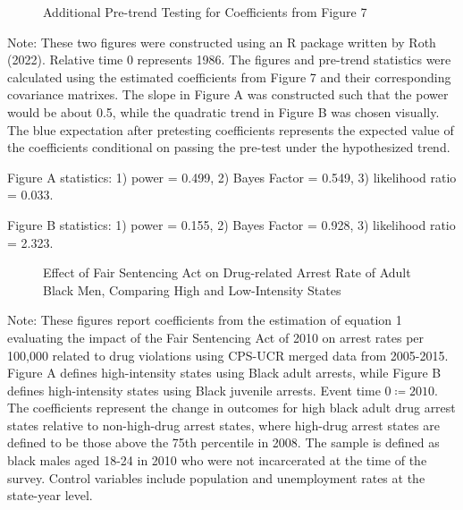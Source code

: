   \clearpage

  \begin{figure}[h]
    \centering
    \caption{Additional Pre-trend Testing for Coefficients from Figure 7}%
    \qquad
    \label{fig:pre-trends_roth}%
  \end{figure}

  \begin{footnotesize}
    \noindent Note: These two figures were constructed using an R package written by Roth (2022). Relative time 0 represents 1986. The figures and pre-trend statistics were calculated using the estimated coefficients from Figure 7 and their corresponding covariance matrixes. The slope in Figure A was constructed such that the power would be about 0.5, while the quadratic trend in Figure B was chosen visually. The blue expectation after pretesting coefficients represents the expected value of the coefficients conditional on passing the pre-test under the hypothesized trend.

    Figure A statistics: 1) power = 0.499, 2) Bayes Factor = 0.549, 3) likelihood ratio = 0.033.

    Figure B statistics: 1) power = 0.155, 2) Bayes Factor = 0.928, 3) likelihood ratio = 2.323.
  \end{footnotesize}

  \clearpage
  
  \begin{figure}[h]
    \centering
    \caption{Effect of Fair Sentencing Act on Drug-related Arrest Rate of Adult Black Men, Comparing High and Low-Intensity States}%
    \qquad
    \label{fig:fs_es_2010}%
  \end{figure}


  \begin{footnotesize}
    \noindent Note: These figures report coefficients from the estimation of equation 1 evaluating the impact of the Fair Sentencing Act of 2010 on arrest rates per 100,000 related to drug violations using CPS-UCR merged data from 2005-2015. Figure A defines high-intensity states using Black adult arrests, while Figure B defines high-intensity states using Black juvenile arrests. Event time $0 \coloneqq 2010$. The coefficients represent the change in outcomes for high black adult drug arrest states relative to non-high-drug arrest states, where high-drug arrest states are defined to be those above the 75th percentile in 2008. The sample is defined as black males aged 18-24 in 2010 who were not incarcerated at the time of the survey. Control variables include population and unemployment rates at the state-year level. 
  \end{footnotesize}

